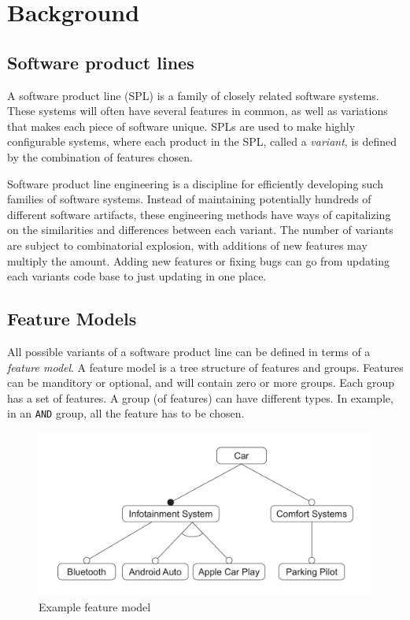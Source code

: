 \documentclass[a4paper,english]{ifimaster}
\begin{document}
\chapter{Background}%
\label{cha:introduction}

\section{Software product lines}%
\label{sec:software_product_lines}

A software product line (SPL) is a family of closely related software systems. These systems will often have several features in common, as well as variations that makes each piece of software unique. SPLs are used to make highly configurable systems, where each product in the SPL, called a \textit{variant}, is defined by the combination of features chosen.

Software product line engineering is a discipline for efficiently developing such families of software systems. Instead of maintaining potentially hundreds of different software artifacts, these engineering methods have ways of capitalizing on the similarities and differences between each variant. The number of variants are subject to combinatorial explosion, with additions of new features may multiply the amount. Adding new features or fixing bugs can go from updating each variants code base to just updating in one place.

\section{Feature Models}%
\label{sec:feature_models}

All possible variants of a software product line can be defined in terms of a \textit{feature model}. A feature model is a tree structure of features and groups. Features can be manditory or optional, and will contain zero or more groups. Each group has a set of features. A group (of features) can have different types. In example, in an \texttt{AND} group, all the feature has to be chosen.

\begin{figure}[htpb]
	\centering
	\includegraphics[width=0.8\linewidth]{illustrations/example.pdf}
	\caption{Example feature model}%
	\label{fig:example1}
\end{figure}
\end{document}
